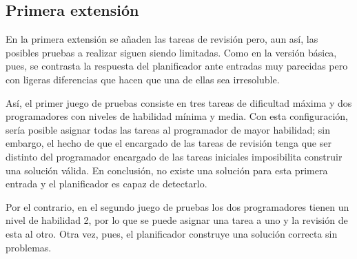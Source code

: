
\subsection{Primera extensión} \label{sec:res-ext1}

En la primera extensión se añaden las tareas de revisión pero, aun así, las 
posibles pruebas a realizar siguen siendo limitadas. Como en la versión 
básica, pues, se contrasta la respuesta del planificador ante entradas muy 
parecidas pero con ligeras diferencias que hacen que una de ellas sea 
irresoluble.

Así, el primer juego de pruebas consiste en tres tareas de dificultad máxima 
y dos programadores con niveles de habilidad mínima y media. Con esta 
configuración, sería posible asignar todas las tareas al programador de mayor 
habilidad; sin embargo, el hecho de que el encargado de las tareas de revisión 
tenga que ser distinto del programador encargado de las tareas iniciales 
imposibilita construir una solución válida. En conclusión, no existe una 
solución para esta primera entrada y el planificador es capaz de detectarlo.

Por el contrario, en el segundo juego de pruebas los dos programadores tienen 
un nivel de habilidad 2, por lo que se puede asignar una tarea a uno y la 
revisión de esta al otro. Otra vez, pues, el planificador construye una 
solución correcta sin problemas.




